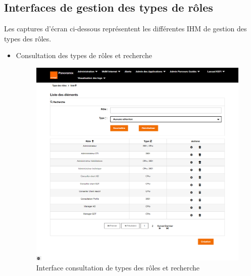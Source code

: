 \subsection{Interfaces de gestion des types de rôles}
Les captures d'écran ci-dessous représentent les différentes IHM de gestion des types des rôles.
\newpage
\begin{itemize}
	\item Consultation des types de rôles et recherche
	\begin{figure}[H]
		\centering
		\includegraphics[width=0.8\linewidth]{"img/screenshots/type roles/index"}
		\caption[Interface consultation de types des rôles et recherche]{Interface consultation de types des rôles et recherche}
		\label{fig:index-tr}
	\end{figure}


\end{itemize}

